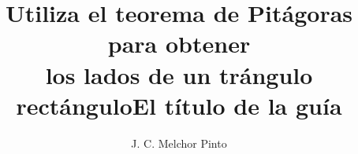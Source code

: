 \documentclass[12pt,addpoints,answers]{guia}
\title{Utiliza el teorema de Pitágoras para obtener \\ los lados de un trángulo rectángulo}
\title{El título de la guía}
\author{J. C. Melchor Pinto}
\begin{document}
\pagestyle{headandfoot}

\INFO
\printanswers

\begin{multicols}{2}
    
    
\end{multicols}
\begin{questions}
    \questionboxed[10] {}
    \questionboxed[10] {}
    \questionboxed[10] {}
    \questionboxed[10] {}
    \questionboxed[10] {}
    \questionboxed[10] {}
    \questionboxed[10] {}
    \questionboxed[10] {}
    \questionboxed[10] {}
    \questionboxed[10] {}
\end{questions}
\end{document}
